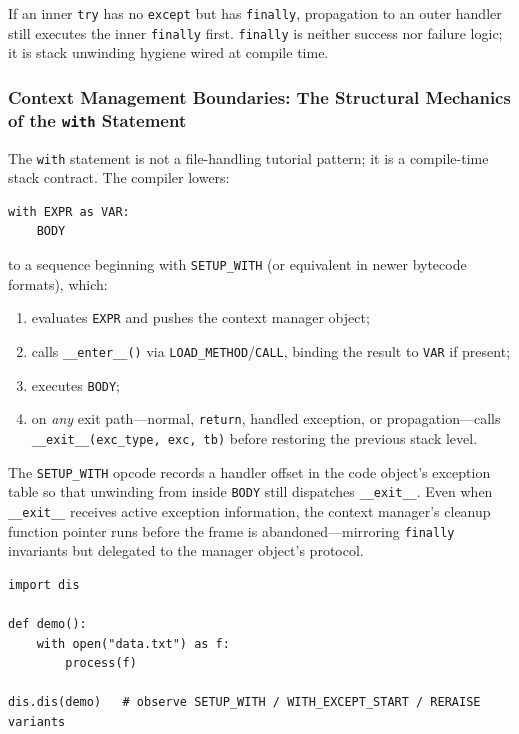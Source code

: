 If an inner \texttt{try} has no \texttt{except} but has \texttt{finally}, propagation to an outer handler still executes the inner \texttt{finally} first. \texttt{finally} is neither success nor failure logic; it is stack unwinding hygiene wired at compile time.

\subsubsection{Context Management Boundaries: The Structural Mechanics of the \texttt{with} Statement}

The \texttt{with} statement is not a file-handling tutorial pattern; it is a compile-time stack contract. The compiler lowers:

\begin{verbatim}
with EXPR as VAR:
    BODY
\end{verbatim}

to a sequence beginning with \texttt{SETUP\_WITH} (or equivalent in newer bytecode formats), which:

\begin{enumerate}
    \item evaluates \texttt{EXPR} and pushes the context manager object;
    \item calls \texttt{\_\_enter\_\_()} via \texttt{LOAD\_METHOD}/\texttt{CALL}, binding the result to \texttt{VAR} if present;
    \item executes \texttt{BODY};
    \item on \emph{any} exit path---normal, \texttt{return}, handled exception, or propagation---calls \texttt{\_\_exit\_\_(exc\_type, exc, tb)} before restoring the previous stack level.
\end{enumerate}

The \texttt{SETUP\_WITH} opcode records a handler offset in the code object's exception table so that unwinding from inside \texttt{BODY} still dispatches \texttt{\_\_exit\_\_}. Even when \texttt{\_\_exit\_\_} receives active exception information, the context manager's cleanup function pointer runs before the frame is abandoned---mirroring \texttt{finally} invariants but delegated to the manager object's protocol.

\begin{verbatim}
import dis

def demo():
    with open("data.txt") as f:
        process(f)

dis.dis(demo)   # observe SETUP_WITH / WITH_EXCEPT_START / RERAISE variants
\end{verbatim}

